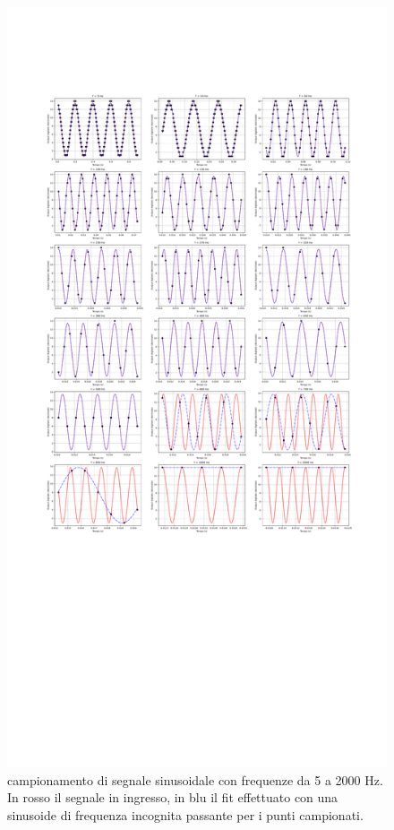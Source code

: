\documentclass[journal]{IEEEtran}
\begin{document}
\clearpage 
\begin{figure}[t]%
\centering
\includegraphics[trim = {150 0 0 400}, width=1.1\textwidth]{analysis/output/cumulative_nyquist_mcu.pdf}
\caption{campionamento di segnale sinusoidale con frequenze da 5 a 2000 Hz. In rosso il segnale in ingresso, in blu il fit effettuato con una sinusoide di frequenza incognita passante per i punti campionati.}
\label{fig:nyquist_mcu_cumulative}
\end{figure}
\end{document}
